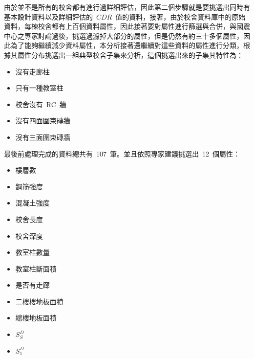 由於並不是所有的校舍都有進行過詳細評估，因此第二個步驟就是要挑選出同時有基本設計資料以及詳細評估的~$CDR$~值的資料，接著，由於校舍資料庫中的原始資料，每棟校舍都有上百個資料屬性，因此接著要對屬性進行篩選與合併，與國震中心之專家討論過後，挑選過濾掉大部分的屬性，但是仍然有約三十多個屬性，因此為了能夠繼續減少資料屬性，本分析接著還繼續對這些資料的屬性進行分類，根據其屬性分布挑選出一組典型校舍子集來分析，這個挑選出來的子集其特性為：


\begin{itemize}
\item 沒有走廊柱
\item 只有一種教室柱
\item 校舍沒有~RC~牆
\item 沒有四面圍束磚牆
\item 沒有三面圍束磚牆
\end{itemize}

最後前處理完成的資料總共有~107~筆。並且依照專家建議挑選出~12~個屬性：

\begin{multicols}{2}
\begin{itemize}
\item 樓層數
\item 鋼筋強度
\item 混凝土強度
\item 校舍長度
\item 校舍深度
\item 教室柱數量
\item 教室柱斷面積
\item 是否有走廊
\item 二樓樓地板面積
\item 總樓地板面積
\item $S^D_S$
\item $S^D_1$
\end{itemize}
\end{multicols}

